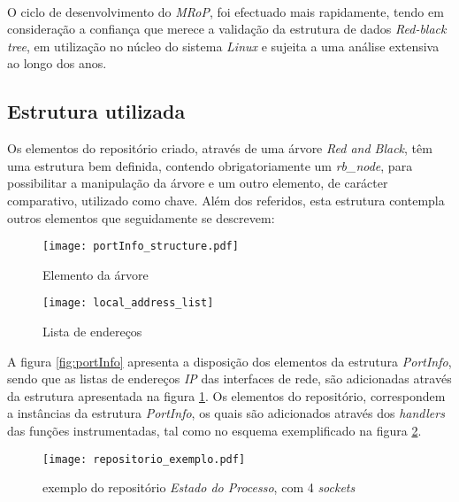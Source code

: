 \paragraph*{}




O ciclo de desenvolvimento do \textit{MRoP}, foi efectuado mais rapidamente, tendo em consideração a confiança que merece a validação da estrutura de dados \textit{Red-black tree}, em utilização no núcleo do sistema \textit{Linux} e sujeita a uma análise extensiva ao longo dos anos.
 
\subsection{Estrutura utilizada}
\label{sub:repo_structure}

Os elementos do repositório criado, através de uma árvore \textit{Red and Black}, têm uma estrutura bem definida, contendo obrigatoriamente um \textit{rb\_node}, para possibilitar a manipulação da árvore e um outro elemento, de carácter comparativo, utilizado como chave.
Além dos referidos, esta estrutura contempla outros elementos que seguidamente se descrevem:

\begin{figure}[ht]
\begin{minipage}[b]{0.5\linewidth}
\centering
\texttt{[image: portInfo\_structure.pdf]}
\caption{Elemento da árvore}
\label{fig:portInfo}
\end{minipage}
\hspace{0.5cm}
\begin{minipage}[b]{0.5\linewidth}
\centering
\texttt{[image: local\_address\_list]}
\caption{Lista de endereços}
\label{fig:local_address_list}
\end{minipage}
\end{figure}

A figura \ref{fig:portInfo} apresenta a disposição dos elementos da estrutura \textit{PortInfo}, sendo que as listas de endereços \textit{IP} das interfaces de rede, são adicionadas através da estrutura apresentada na figura \ref{fig:local_address_list}.
Os elementos do repositório, correspondem a instâncias da estrutura \textit{PortInfo}, os quais são adicionados através dos \textit{handlers} das funções instrumentadas, tal como no esquema exemplificado na figura \ref{fig:repo_example}.

\begin{figure}[!htbp]
\centering
\texttt{[image: repositorio\_exemplo.pdf]}
\caption{exemplo do repositório \textit{Estado do Processo}, com 4 \textit{sockets}}
\label{fig:repo_example}
\end{figure}

